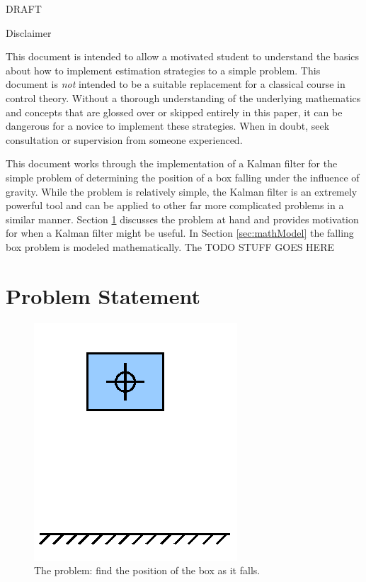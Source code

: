 \documentclass{article}
\begin{document}
\maketitle


\begin{center}
\Huge 
DRAFT
\normalsize
\end{center}
\vspace{4cm}

Disclaimer

This document is intended to allow a motivated student to understand the basics about how to implement estimation strategies to a simple problem.  This document is \emph{not} intended to be a suitable replacement for a classical course in control theory.  Without a thorough understanding of the underlying mathematics and concepts that are glossed over or skipped entirely in this paper, it can be dangerous for a novice to implement these strategies.  When in doubt, seek consultation or supervision from someone experienced.

\newpage

This document works through the implementation of a Kalman filter for the simple problem of determining the position of a box falling under the influence of gravity.  While the problem is relatively simple, the Kalman filter is an extremely powerful tool and can be applied to other far more complicated problems in a similar manner.  Section \ref{sec:probStatement} discusses the problem at hand and provides motivation for when a Kalman filter might be useful.  In Section \ref{sec:mathModel} the falling box problem is modeled mathematically.  The TODO STUFF GOES HERE


\section{Problem Statement}
\label{sec:probStatement}

\begin{figure}[h]
\includegraphics[scale=0.25]{boxPicture.png}
\centering
\caption{The problem: find the position of the box as it falls.}
\label{fig:boxPic}
\end{figure}
\end{document}
